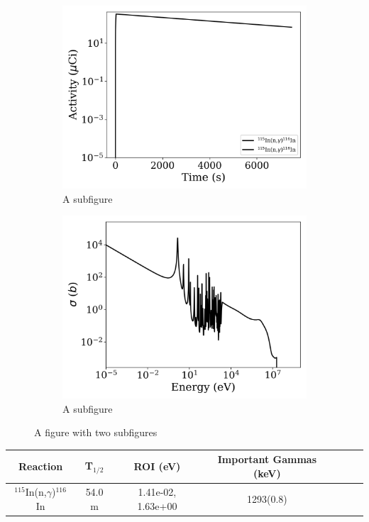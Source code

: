 \begin{figure}[h]
\centering
\begin{subfigure}{.5\textwidth}
  \centering
     \includegraphics[width=.8\textwidth]{plot/In-115(n,gamma)In-116_wisconsin1} 

  \caption{A subfigure}
  \label{fig:sub1}
\end{subfigure}%
\begin{subfigure}{.5\textwidth}
  \centering
     \includegraphics[width=.8\textwidth]{plot/In-115(n,gamma)In-116} 

  \caption{A subfigure}
  \label{fig:sub2}
\end{subfigure}
\caption{A figure with two subfigures}
\label{fig:test}
\end{figure}

\begin{table}[h]
\centering
\begin{tabular}{ |c|c|c|c|c|c|c| }
 \hline
 Reaction & T$_{1/2}$ & ROI (eV) & Important Gammas (keV) \\
 \hline 
 $^{115}$In(n,$\gamma$)$^{116}$In & 54.0 m & 1.41e-02, 1.63e+00 & 1293(0.8) \\ 
\hline
\end{tabular}
\end{table}
